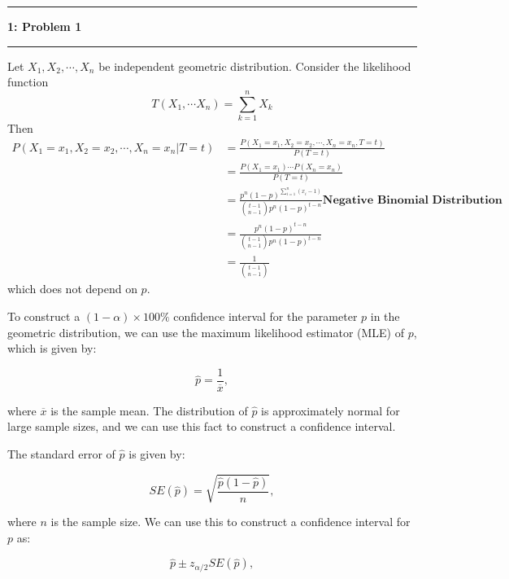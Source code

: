 \documentclass[11pt]{article}
\newcommand\question[2]{\vspace{.25in}\hrule\textbf{#1: #2}\vspace{.5em}\hrule\vspace{.10in}}
\begin{document}
\raggedright
\newcommand\NAME{Carl Kingsford}  %
\newcommand\ANDREWID{ckingsf}     %
\newcommand\HWNUM{1}              %



\question{1}{Problem 1}
Let $X_1, X_2, \cdots, X_n$ be independent geometric distribution.
Consider the likelihood function
\[T(X_1, \cdots X_n) =  \sum_{k=1}^{n}X_k\]
Then
\begin{align*}
    P(X_1=x_1,X_2=x_2,\cdots,X_n=x_n| T=t) &= \frac{P(X_1=x_1,X_2=x_2,\cdots,X_n=x_n, T=t)}{P(T=t)}\\
                                           &= \frac{P(X_1=x_1)\cdots P(X_n=x_n)}{P(T=t)}  \\
                                           &= \frac{p^n(1-p)^{\sum_{i=1}^{n}(x_i-1)}}{\binom{t-1}{n-1}p^{n}(1-p)^{t-n}} \textbf{Negative Binomial Distribution}\\
                                           &= \frac{p^n(1-p)^{t-n}}{\binom{t-1}{n-1}p^{n}(1-p)^{t-n}}\\
                                           &= \frac{1}{\binom{t-1}{n-1}}
\end{align*}
which does not depend on $p$.

To construct a $(1-\alpha)\times 100\%$ confidence interval for the parameter $p$ in the geometric distribution, we can use the maximum likelihood estimator (MLE) of $p$, which is given by:

$$ \hat{p} = \frac{1}{\overline{x}}, $$

where $\overline{x}$ is the sample mean. The distribution of $\hat{p}$ is approximately normal for large sample sizes, and we can use this fact to construct a confidence interval.

The standard error of $\hat{p}$ is given by:

$$ SE(\hat{p}) = \sqrt{\frac{\hat{p}(1-\hat{p})}{n}}, $$

where $n$ is the sample size. We can use this to construct a confidence interval for $p$ as:

$$ \hat{p} \pm z_{\alpha/2}SE(\hat{p}), $$
\end{document}
